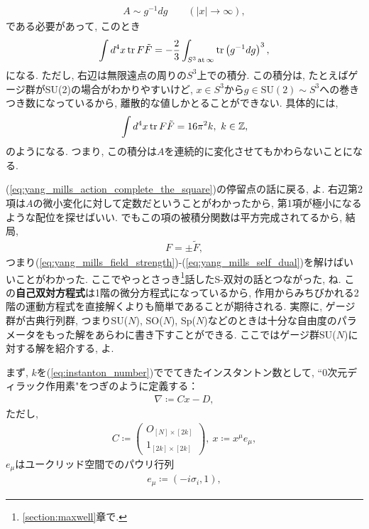 \documentclass{ltjsarticle}
\theoremstyle{definition}
\begin{document}
\begin{gather}
  A\sim g^{-1}dg\qquad\left(|x|\to\infty\right),
\end{gather}
である必要があって, このとき
\begin{gather}
  \int d^4x\tr F\tilde F=-\frac23\int_{S^3\,\text{at}\,\infty}\tr\left(g^{-1}dg\right)^3,
\end{gather}
になる. ただし, 右辺は無限遠点の周りの$S^3$上での積分. この積分は, たとえばゲージ群がSU(2)の場合がわかりやすいけど, $x\in S^3$から$g\in\mathrm{SU(2)}\sim S^3$への巻きつき数になっているから, 離散的な値しかとることができない. 具体的には,
\begin{gather}
  \int d^4x\tr F\tilde F=16\pi^2k,\ k\in\mathbb Z,\label{eq:instanton_number}
\end{gather}
のようになる. つまり, この積分は$A$を連続的に変化させてもかわらないことになる.\par
(\ref{eq:yang_mills_action_complete_the_square})の停留点の話に戻る, よ. 右辺第2項は$A$の微小変化に対して定数だということがわかったから, 第1項が極小になるような配位を探せばいい. でもこの項の被積分関数は平方完成されてるから, 結局,
\begin{gather}
  F=\pm\tilde F,
\end{gather}
つまり(\ref{eq:yang_mills_field_strength})-(\ref{eq:yang_mills_self_dual})を解けばいいことがわかった. ここでやっとさっき\footnote{\ref{section:maxwell}章で.}話したS-双対の話とつながった, ね. この\textbf{自己双対方程式}は1階の微分方程式になっているから, 作用からみちびかれる2階の運動方程式を直接解くよりも簡単であることが期待される. 実際に, ゲージ群が古典行列群, つまりSU($N$), SO($N$), Sp($N$)などのときは十分な自由度のパラメータをもった解をあらわに書き下すことができる. ここではゲージ群SU($N$)に対する解を紹介する, よ.\par
まず, $k$を(\ref{eq:instanton_number})ででてきたインスタントン数として, ``0次元ディラック作用素"をつぎのように定義する：
\begin{gather}
  \nabla\coloneqq Cx-D,
\end{gather}
ただし,
\begin{gather}
  C\coloneqq
  \begin{pmatrix}
    O_{[N]\times[2k]}\\1_{[2k]\times[2k]}
  \end{pmatrix},\ 
  x\coloneqq x^\mu e_\mu,
\end{gather}
$e_\mu$はユークリッド空間でのパウリ行列
\begin{gather}
  e_\mu\coloneqq\left(-i\sigma_i,1\right),
\end{gather}
\end{document}
